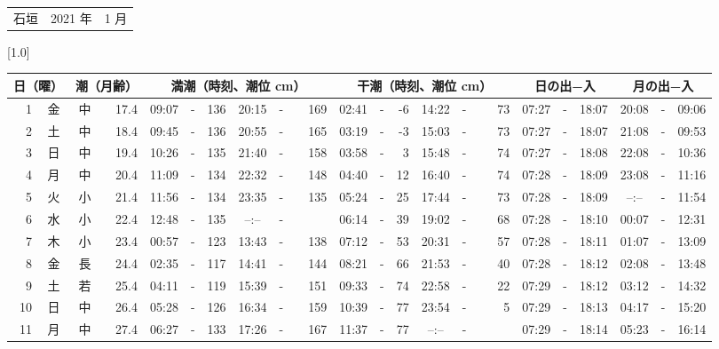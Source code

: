 \documentclass[12pt,a4j]{jsarticle}
\begin{document}
 \begin{table}[htbp]
 \begin{center}
 \begin{tabular}{lcc}
 \LARGE{石垣}  & \large{2021 年} & \large{ 1 月} \\
 \end{tabular}
 \end{center}
 \begin{center}
    \scalebox{0.7}[1.0]{
    \begin{tabular}{|rc|cr|ccrccr|ccrccr|ccc|ccc|}
    \hline
    \multicolumn{2}{|c|}{日（曜）} & \multicolumn{2}{c|}{潮（月齢）} & \multicolumn{6}{c|}{満潮（時刻、潮位 cm）} & \multicolumn{6}{c|}{干潮（時刻、潮位 cm）} & \multicolumn{3}{c|}{日の出−入} &  \multicolumn{3}{c|}{月の出−入}\\
 \hline
 1 & 金 & 中 & 17.4 &  09:07 &-& 136 &  20:15 &-& 169 &  02:41 &-&  -6 &  14:22 &-&  73 & 07:27 & -& 18:07 & 20:08 & -& 09:06 \\
 2 & 土 & 中 & 18.4 &  09:45 &-& 136 &  20:55 &-& 165 &  03:19 &-&  -3 &  15:03 &-&  73 & 07:27 & -& 18:07 & 21:08 & -& 09:53 \\
 3 & 日 & 中 & 19.4 &  10:26 &-& 135 &  21:40 &-& 158 &  03:58 &-&   3 &  15:48 &-&  74 & 07:27 & -& 18:08 & 22:08 & -& 10:36 \\
 4 & 月 & 中 & 20.4 &  11:09 &-& 134 &  22:32 &-& 148 &  04:40 &-&  12 &  16:40 &-&  74 & 07:28 & -& 18:09 & 23:08 & -& 11:16 \\
 5 & 火 & 小 & 21.4 &  11:56 &-& 134 &  23:35 &-& 135 &  05:24 &-&  25 &  17:44 &-&  73 & 07:28 & -& 18:09 & --:-- & -& 11:54 \\
 6 & 水 & 小 & 22.4 &  12:48 &-& 135 &  --:-- &-&~~~~~ &  06:14 &-&  39 &  19:02 &-&  68 & 07:28 & -& 18:10 & 00:07 & -& 12:31 \\
 7 & 木 & 小 & 23.4 &  00:57 &-& 123 &  13:43 &-& 138 &  07:12 &-&  53 &  20:31 &-&  57 & 07:28 & -& 18:11 & 01:07 & -& 13:09 \\
 8 & 金 & 長 & 24.4 &  02:35 &-& 117 &  14:41 &-& 144 &  08:21 &-&  66 &  21:53 &-&  40 & 07:28 & -& 18:12 & 02:08 & -& 13:48 \\
 9 & 土 & 若 & 25.4 &  04:11 &-& 119 &  15:39 &-& 151 &  09:33 &-&  74 &  22:58 &-&  22 & 07:29 & -& 18:12 & 03:12 & -& 14:32 \\
10 & 日 & 中 & 26.4 &  05:28 &-& 126 &  16:34 &-& 159 &  10:39 &-&  77 &  23:54 &-&   5 & 07:29 & -& 18:13 & 04:17 & -& 15:20 \\
11 & 月 & 中 & 27.4 &  06:27 &-& 133 &  17:26 &-& 167 &  11:37 &-&  77 &  --:-- &-&~~~~~ & 07:29 & -& 18:14 & 05:23 & -& 16:14 \\

\end{tabular}}
\end{center}
\end{table}
\end{document}
